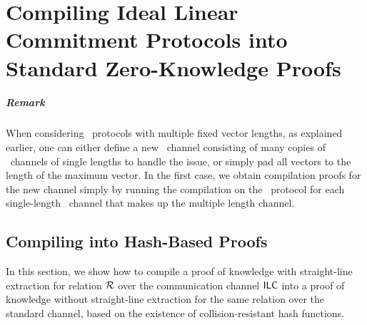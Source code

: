 \chapter{Compiling Ideal Linear Commitment Protocols into Standard Zero-Knowledge Proofs}
\label{chapterlabel:Compilation-Proof}

\paragraph{Remark} When considering \ILC\ protocols with multiple fixed vector lengths, as explained earlier, one can either define a new \ILC\ channel consisting of many copies of \ILC\ channels of single lengths to handle the issue, or simply pad all vectors to the length of the maximum vector. In the first case, we obtain compilation proofs for the new channel simply by running the compilation on the \ILC\ protocol for each single-length \ILC\ channel that makes up the multiple length channel.
%

\section{Compiling into Hash-Based Proofs}
\label{sec:IPCPgencon}\label{sec:ILCtoIOP}
In this section, we show how to compile a proof of knowledge with straight-line extraction for relation $\mathcal{R}$ over the communication channel $\mathsf{ILC}$ into a proof of knowledge without straight-line extraction for the same relation over the standard channel, based on the existence of collision-resistant hash functions.

